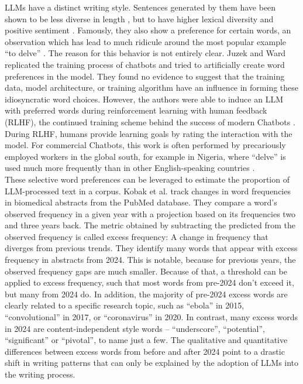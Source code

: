 LLMs have a distinct writing style.
Sentences generated by them have been shown to be less diverse in length \cite{Desaire2023}, but to have higher lexical diversity and positive sentiment \cite{Mak2025}.
Famously, they also show a preference for certain words, an observation which has lead to much ridicule around the most popular example ``to delve'' \cite{MacClure2024}.
The reason for this behavior is not entirely clear.
Juzek and Ward \cite{Juzek2025} replicated the training process of chatbots and tried to artificially create word preferences in the model.
They found no evidence to suggest that the training data, model architecture, or training algorithm have an influence in forming these idiosyncratic word choices.
However, the authors were able to induce an LLM with preferred words during reinforcement learning with human feedback (RLHF), the continued training scheme behind the success of modern Chatbots \cite{Bai2022}.
During RLHF, humans provide learning goals by rating the interaction with the model.
For commercial Chatbots, this work is often performed by precariously employed workers in the global south, for example in Nigeria, where ``delve'' is used much more frequently than in other English-speaking countries \cite{Perrigo2023, Hern2024}.
\\
These selective word preferences can be leveraged to estimate the proportion of LLM-processed text in a corpus.
Kobak et al. \cite{Kobak2025} track changes in word frequencies in biomedical abstracts from the PubMed database.
They compare a word's observed frequency in a given year with a projection based on its frequencies two and three years back.
The metric obtained by subtracting the predicted from the observed frequency is called excess frequency: A change in frequency that diverges from previous trends.
They identify many words that appear with excess frequency in abstracts from 2024.
This is notable, because for previous years, the observed frequency gaps are much smaller.
Because of that, a threshold can be applied to excess frequency, such that most words from pre-2024 don't exceed it, but many from 2024 do.
In addition, the majority of pre-2024 excess words are clearly related to a specific research topic, such as ``ebola'' in 2015, ``convolutional'' in 2017, or ``coronavirus'' in 2020.
In contrast, many excess words in 2024 are content-independent style words -- ``underscore'', ``potential'', ``significant'' or ``pivotal'', to name just a few.
The qualitative and quantitative differences between excess words from before and after 2024 point to a drastic shift in writing patterns that can only be explained by the adoption of LLMs into the writing process.
